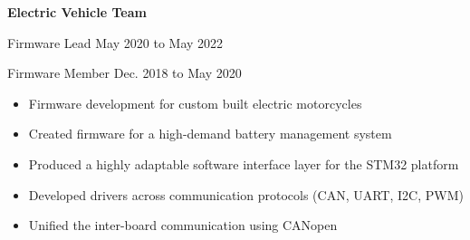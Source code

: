 \documentclass{article}
\newcommand{\rSubSubSection}[1] {
  \textbf{#1}
}
\begin{document}
\vspace{-15pt}
\rSubSubSection{Electric Vehicle Team}\par
Firmware Lead \hfill May 2020 to May 2022 \par
Firmware Member \hfill Dec. 2018 to May 2020 \par
\begin{itemize}[leftmargin=*]
    \item Firmware development for custom built electric motorcycles
    \item Created firmware for a high-demand battery management system
    \item Produced a highly adaptable software interface layer for the STM32 platform
    \item Developed drivers across communication protocols (CAN, UART, I2C, PWM)
    \item Unified the inter-board communication using CANopen
\end{itemize}
\end{document}
